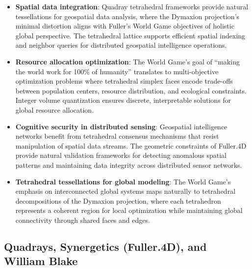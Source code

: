 \documentclass[
  10pt,
]{article}
\providecommand{\tightlist}{%
  \setlength{\itemsep}{0pt}\setlength{\parskip}{0pt}}
\begin{document}
\begin{itemize}
\tightlist
\item
  \textbf{Spatial data integration}: Quadray tetrahedral frameworks
  provide natural tessellations for geospatial data analysis, where the
  Dymaxion projection's minimal distortion aligns with Fuller's World
  Game objectives of holistic global perspective. The tetrahedral
  lattice supports efficient spatial indexing and neighbor queries for
  distributed geospatial intelligence operations.
\item
  \textbf{Resource allocation optimization}: The World Game's goal of
  ``making the world work for 100\% of humanity'' translates to
  multi-objective optimization problems where tetrahedral simplex faces
  encode trade-offs between population centers, resource distribution,
  and ecological constraints. Integer volume quantization ensures
  discrete, interpretable solutions for global resource allocation.
\item
  \textbf{Cognitive security in distributed sensing}: Geospatial
  intelligence networks benefit from tetrahedral consensus mechanisms
  that resist manipulation of spatial data streams. The geometric
  constraints of Fuller.4D provide natural validation frameworks for
  detecting anomalous spatial patterns and maintaining data integrity
  across distributed sensor networks.
\item
  \textbf{Tetrahedral tessellations for global modeling}: The World
  Game's emphasis on interconnected global systems maps naturally to
  tetrahedral decompositions of the Dymaxion projection, where each
  tetrahedron represents a coherent region for local optimization while
  maintaining global connectivity through shared faces and edges.
\end{itemize}

\subsection{Quadrays, Synergetics (Fuller.4D), and William
Blake}\label{quadrays-synergetics-fuller.4d-and-william-blake}
\end{document}
